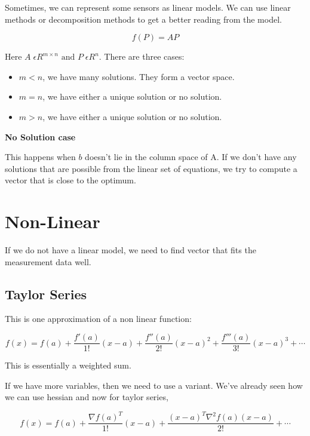 Sometimes, we can represent some sensors as linear models. We can use linear methods or decomposition methods to get a better reading from the model.

\begin{equation}
    f(P) = AP
\end{equation}

Here $A\; \epsilon R^{m \times n} \text{ and } P\; \epsilon R^n$. There are three cases:

\begin{itemize}
    \item $m < n$, we have many solutions. They form a vector space.
    \item $m = n$, we have either a unique solution or no solution.
    \item $m > n$, we have either a unique solution or no solution.
\end{itemize}

\textbf{No Solution case}

This happens when $b$ doesn't lie in the column space of A. If we don't have any solutions that are possible from the linear set of equations, we try to compute a vector that is close to the optimum.

\section{Non-Linear}

If we do not have a linear model, we need to find vector that fits the measurement data well.

\subsection{Taylor Series}

This is one approximation of a non linear function:

\begin{equation}
    f(x) = f(a) + \frac{f'(a)}{1!}(x-a) + \frac{f''(a)}{2!}(x-a)^2 + \frac{f'''(a)}{3!}(x-a)^3 + \cdots
\end{equation}

This is essentially a weighted sum.

If we have more variables, then we need to use a variant. We've already seen how we can use hessian and now for taylor series,

\begin{equation}
    f(x) = f(a) + \frac{\nabla f(a)^T}{1!}(x-a) + \frac{(x-a)^T \nabla^2f(a)(x-a)}{2!} +  \cdots
\end{equation}

